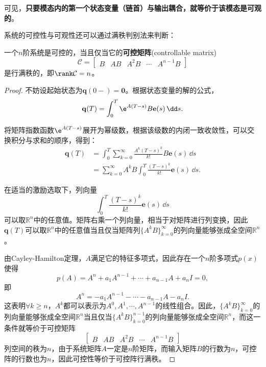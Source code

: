 可见，\textbf{只要模态内的第一个状态变量（链首）与输出耦合，就等价于该模态是可观的}。

系统的可控性与可观性还可以通过满秩判别法来判断：

\begin{theorem}[可控性的满秩判别法]
    一个$n$阶系统是可控的，当且仅当它的\textbf{可控矩阵}(controllable matrix)
    \begin{equation}
        \mathcal{C}=\begin{bmatrix}
        B & AB & A^2B & \cdots & A^{n-1}B
        \end{bmatrix}
    \end{equation}
    是行满秩的，即$\rank\mathcal{C}=n$。
\end{theorem}
\begin{proof}
    不妨设起始状态为$\mathbf{q}(0-)=\mathbf{0}$。根据状态变量的解的公式，
    \begin{equation}
        \mathbf{q}(T)=\int_0^T \e^{A(T-s)}B\mathbf{e}(s)\,\dd s.
    \end{equation}

    将矩阵指数函数$\e^{A(T-s)}$展开为幂级数，根据该级数的内闭一致收敛性，可以交换积分与求和的顺序，得到：
    \begin{align}
        \mathbf{q}(T)&=\int_0^T \sum_{k=0}^\infty \frac{A^k(T-s)^k}{k!}B\mathbf{e}(s)\,\dd s\nonumber\\
        &=\sum_{k=0}^\infty A^k B\int_0^T \frac{(T-s)^k}{k!} \mathbf{e}(s)\,\dd s.
    \end{align}

    在适当的激励选取下，列向量
    \begin{equation}
        \int_0^T \frac{(T-s)^k}{k!} \mathbf{e}(s)\,\dd s
    \end{equation}
    可以取$\mathbb{R}^n$中的任意值。矩阵右乘一个列向量，相当于对矩阵进行列变换，因此$\mathbf{q}(T)$可以取$\mathbb{R}^n$中的任意值当且仅当矩阵列$\{A^k B\}_{k=0}^\infty$的列向量能够张成全空间$\mathbb{R}^n$。

    由Cayley-Hamilton定理，$A$满足它的特征多项式，因此存在一个$n$阶多项式$p(x)$使得
    \begin{equation}
        p(A)=A^n+a_1 A^{n-1}+\cdots+a_{n-1}A+a_n I=0,
    \end{equation}
    即
    \begin{equation}
        A^n=-a_1 A^{n-1}-\cdots-a_{n-1}A-a_n I.
    \end{equation}
    这表明$\forall k\geq n$，$A^k$都可以表示为$A^0,A^1,\cdots,A^{n-1}$的线性组合。因此，$\{A^k B\}_{k=0}^\infty$的列向量能够张成全空间$\mathbb{R}^n$当且仅当$\{A^k B\}_{k=0}^{n-1}$的列向量能够张成全空间$\mathbb{R}^n$，而这一条件就等价于可控矩阵
    \begin{equation}
        \begin{bmatrix}
        B & AB & A^2B & \cdots & A^{n-1}B
        \end{bmatrix}
    \end{equation}
    列空间的秩为$n$，由于系统矩阵$A$一定是$n$阶矩阵，而输入矩阵$B$的行数为$n$，可控阵的行数也为$n$，因此可控性等价于可控阵行满秩。
\end{proof}

